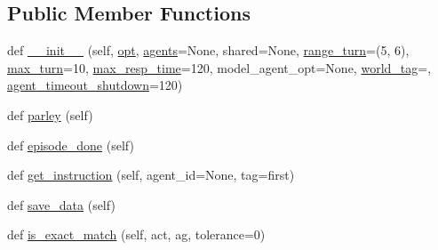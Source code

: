 \subsection*{Public Member Functions}
\begin{DoxyCompactItemize}
\item 
def \hyperlink{classparlai_1_1mturk_1_1tasks_1_1convai2__model__eval_1_1worlds_1_1Convai2EvalWorld_aebd879770da18f491cae32619941df73}{\+\_\+\+\_\+init\+\_\+\+\_\+} (self, \hyperlink{classparlai_1_1core_1_1worlds_1_1World_a3640d92718acd3e6942a28c1ab3678bd}{opt}, \hyperlink{classparlai_1_1core_1_1worlds_1_1MultiAgentDialogWorld_a05fc93525cb86edef121980fc55f9926}{agents}=None, shared=None, \hyperlink{classparlai_1_1mturk_1_1tasks_1_1convai2__model__eval_1_1worlds_1_1Convai2EvalWorld_aa02c614eed2a38a396d6983a8cdab7a3}{range\+\_\+turn}=(5, 6), \hyperlink{classparlai_1_1mturk_1_1tasks_1_1convai2__model__eval_1_1worlds_1_1Convai2EvalWorld_ae7db2e165123013a4e83dec5c03b65c4}{max\+\_\+turn}=10, \hyperlink{classparlai_1_1mturk_1_1tasks_1_1convai2__model__eval_1_1worlds_1_1Convai2EvalWorld_af6ca258fd4c5f59c8250ade8d1ecd111}{max\+\_\+resp\+\_\+time}=120, model\+\_\+agent\+\_\+opt=None, \hyperlink{classparlai_1_1mturk_1_1tasks_1_1convai2__model__eval_1_1worlds_1_1Convai2EvalWorld_ac3c2c639d22166002b9a8ee1982f3f3f}{world\+\_\+tag}=\textquotesingle{}\textquotesingle{}, \hyperlink{classparlai_1_1mturk_1_1tasks_1_1convai2__model__eval_1_1worlds_1_1Convai2EvalWorld_abb5303f4898bce84f4404b677cb02163}{agent\+\_\+timeout\+\_\+shutdown}=120)
\item 
def \hyperlink{classparlai_1_1mturk_1_1tasks_1_1convai2__model__eval_1_1worlds_1_1Convai2EvalWorld_a88eef2bcb0b78f250ba0035df4975652}{parley} (self)
\item 
def \hyperlink{classparlai_1_1mturk_1_1tasks_1_1convai2__model__eval_1_1worlds_1_1Convai2EvalWorld_a9ba270c76614ca60f115fe0353cfd056}{episode\+\_\+done} (self)
\item 
def \hyperlink{classparlai_1_1mturk_1_1tasks_1_1convai2__model__eval_1_1worlds_1_1Convai2EvalWorld_a297aba27c40c516873f178758c503079}{get\+\_\+instruction} (self, agent\+\_\+id=None, tag=\textquotesingle{}first\textquotesingle{})
\item 
def \hyperlink{classparlai_1_1mturk_1_1tasks_1_1convai2__model__eval_1_1worlds_1_1Convai2EvalWorld_a5eb844afbe19ad750c806377798065b7}{save\+\_\+data} (self)
\item 
def \hyperlink{classparlai_1_1mturk_1_1tasks_1_1convai2__model__eval_1_1worlds_1_1Convai2EvalWorld_af615b8beec269ea925c371b955669770}{is\+\_\+exact\+\_\+match} (self, act, ag, tolerance=0)

\end{DoxyCompactItemize}
